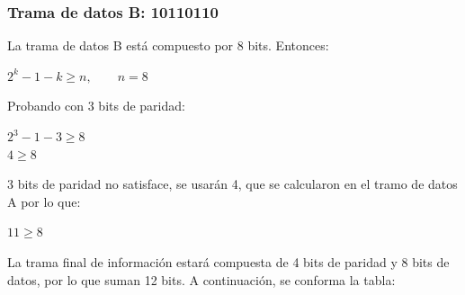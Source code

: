 \subsubsection{Trama de datos B: 10110110}
\noindent{} La trama de datos B está compuesto por 8 bits. Entonces:
\begin{center}\Large
    $2^k - 1 - k \geq n,\qquad{}n=8$
\end{center}
\noindent{} Probando con 3 bits de paridad:
\begin{center}\Large
    $2^3 - 1 - 3 \geq 8$ \\[5pt]
    $4 \geq 8$
\end{center}
\noindent{} 3 bits de paridad no satisface, se usarán 4, que se calcularon en el tramo de datos A por lo que:
\begin{center}\Large $11 \geq 8$ \end{center}
\sangria{} La trama final de información estará compuesta de 4 bits de paridad y 8 bits de datos, por lo que suman 12 bits. A continuación, se conforma la tabla:

